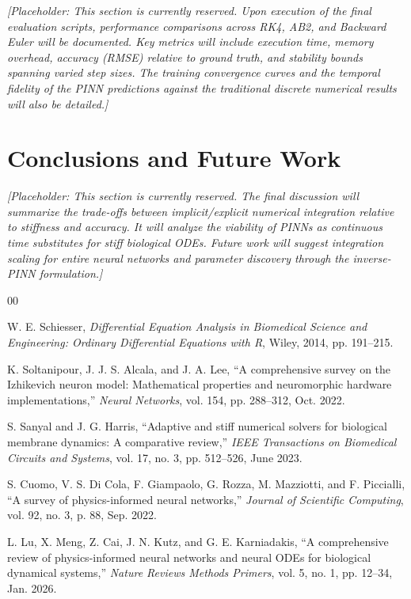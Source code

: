 \documentclass[conference]{IEEEtran}
\begin{document}
\textit{[Placeholder: This section is currently reserved. Upon execution of the final evaluation scripts, performance comparisons across RK4, AB2, and Backward Euler will be documented. Key metrics will include execution time, memory overhead, accuracy (RMSE) relative to ground truth, and stability bounds spanning varied step sizes. The training convergence curves and the temporal fidelity of the PINN predictions against the traditional discrete numerical results will also be detailed.]}

\section{Conclusions and Future Work}

\textit{[Placeholder: This section is currently reserved. The final discussion will summarize the trade-offs between implicit/explicit numerical integration relative to stiffness and accuracy. It will analyze the viability of PINNs as continuous time substitutes for stiff biological ODEs. Future work will suggest integration scaling for entire neural networks and parameter discovery through the inverse-PINN formulation.]}

\begin{thebibliography}{00}

 W. E. Schiesser, \emph{Differential Equation Analysis in Biomedical Science and Engineering: Ordinary Differential Equations with R}, Wiley, 2014, pp. 191--215.

 K. Soltanipour, J. J. S. Alcala, and J. A. Lee, ``A comprehensive survey on the Izhikevich neuron model: Mathematical properties and neuromorphic hardware implementations,'' \emph{Neural Networks}, vol. 154, pp. 288--312, Oct. 2022.

 S. Sanyal and J. G. Harris, ``Adaptive and stiff numerical solvers for biological membrane dynamics: A comparative review,'' \emph{IEEE Transactions on Biomedical Circuits and Systems}, vol. 17, no. 3, pp. 512--526, June 2023.

 S. Cuomo, V. S. Di Cola, F. Giampaolo, G. Rozza, M. Mazziotti, and F. Piccialli, ``A survey of physics-informed neural networks,'' \emph{Journal of Scientific Computing}, vol. 92, no. 3, p. 88, Sep. 2022.

 L. Lu, X. Meng, Z. Cai, J. N. Kutz, and G. E. Karniadakis, ``A comprehensive review of physics-informed neural networks and neural ODEs for biological dynamical systems,'' \emph{Nature Reviews Methods Primers}, vol. 5, no. 1, pp. 12--34, Jan. 2026.

\end{thebibliography}
\end{document}
